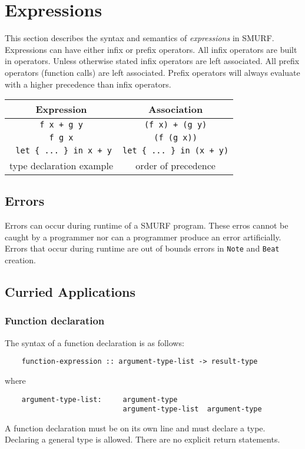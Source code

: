 \section{Expressions}

This section describes the syntax and semantics of \emph{expressions} in 
SMURF. Expressions can have either infix or prefix operators. All 
infix operators are built in operators. Unless otherwise stated infix 
operators are left associated. All prefix operators (function calls) 
are left associated. Prefix operators will always evaluate with a 
higher precedence than infix operators.  


\begin{center}
	\begin{tabular}{|c|c|}
		\hline
		Expression & Association \\
		\hline
		\texttt{f x + g y} & \texttt{(f x) + (g y)} \\
		\texttt{f g x} & \texttt{(f (g x))} \\
		\texttt{ let \{ ... \} in x + y} & \texttt{let \{ ... \} in (x + y)} \\
		type declaration example & order of precedence \\
		\hline
	\end{tabular}
\end{center}


\subsection{Errors}

Errors can occur during runtime of a SMURF program. These erros cannot be 
caught by a programmer nor can a programmer produce an error artificially. 
Errors that occur during runtime are out of bounds errors in \texttt{Note} 
and \texttt{Beat} creation.

\subsection{Curried Applications}

    \subsubsection{Function declaration}
    The syntax of a function declaration is as follows: 
    \begin{verbatim} 
    function-expression :: argument-type-list -> result-type 
    \end{verbatim} 
    where
    \begin{verbatim}
    argument-type-list:     argument-type
                            argument-type-list  argument-type
    \end{verbatim} 
A function declaration must be on its own line and must declare a type. Declaring a general type is allowed. There are no explicit return statements.
  
